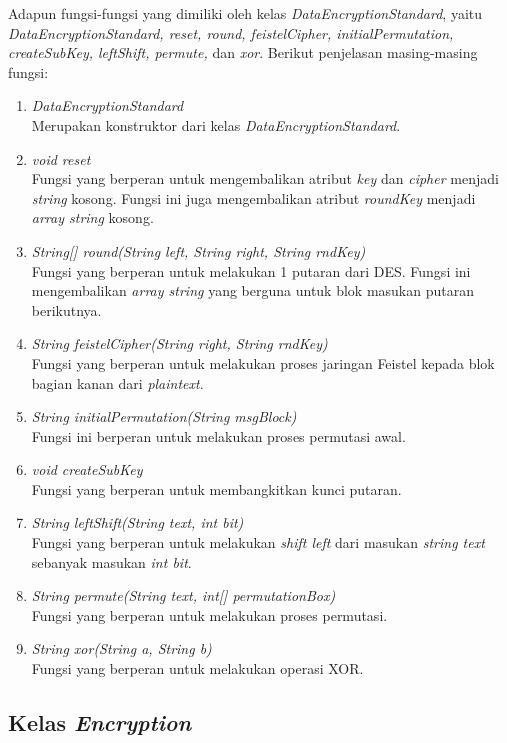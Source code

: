 Adapun fungsi-fungsi yang dimiliki oleh kelas \textit{DataEncryptionStandard}, yaitu \textit{DataEncryptionStandard, reset, round, feistelCipher, initialPermutation, createSubKey, leftShift, permute,} dan \textit{xor}. Berikut penjelasan masing-masing fungsi:

\begin{enumerate}
	\item \textit{DataEncryptionStandard} \\
	Merupakan konstruktor dari kelas \textit{DataEncryptionStandard}.
	\item \textit{void reset} \\
	Fungsi yang berperan untuk mengembalikan atribut \textit{key} dan \textit{cipher} menjadi \textit{string} kosong. Fungsi ini juga mengembalikan atribut \textit{roundKey} menjadi \textit{array string} kosong.
	\item \textit{String[] round(String left, String right, String rndKey)} \\
	Fungsi yang berperan untuk melakukan 1 putaran dari DES. Fungsi ini mengembalikan \textit{array string} yang berguna untuk blok masukan putaran berikutnya.
	\item \textit{String feistelCipher(String right, String rndKey)} \\
	Fungsi yang berperan untuk melakukan proses jaringan Feistel kepada blok bagian kanan dari \textit{plaintext}.
	\item \textit{String initialPermutation(String msgBlock)} \\
	Fungsi ini berperan untuk melakukan proses permutasi awal.
	\item \textit{void createSubKey} \\
	Fungsi yang berperan untuk membangkitkan kunci putaran.
	\item \textit{String leftShift(String text, int bit)} \\
	Fungsi yang berperan untuk melakukan \textit{shift left} dari masukan \textit{string text} sebanyak masukan \textit{int bit}.
	\item \textit{String permute(String text, int[] permutationBox)} \\
	Fungsi yang berperan untuk melakukan proses permutasi.
	\item \textit{String xor(String a, String b)} \\
	Fungsi yang berperan untuk melakukan operasi XOR.
\end{enumerate}

\subsection{Kelas \textit{Encryption}}

